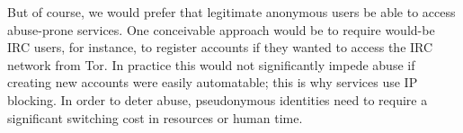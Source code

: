 \documentclass{llncs}
\newenvironment{tightlist}{\begin{list}{$\bullet$}{
  \setlength{\itemsep}{0mm}
    \setlength{\parsep}{0mm}
    }}{\end{list}}
\begin{document}
But of course, we would prefer that legitimate anonymous users be able to
access abuse-prone services.  One conceivable approach would be to require
would-be IRC users, for instance, to register accounts if they wanted to
access the IRC network from Tor.  In practice this would not
significantly impede abuse if creating new accounts were easily automatable;
this is why services use IP blocking.  In order to deter abuse, pseudonymous
identities need to require a significant switching cost in resources or human
time.


\end{document}
